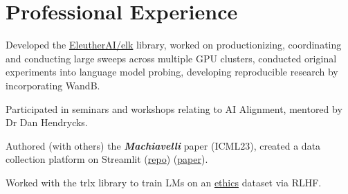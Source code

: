 \documentclass[]{deedy-resume-openfont}
\begin{document}
\begin{minipage}[t]{0.66\textwidth} 


\section{Professional Experience}

\vspace{\topsep} %
\begin{tightemize}
\item Developed the \href{https://github.com/EleutherAI/elk}{EleutherAI/elk} library, worked on productionizing, coordinating and conducting large sweeps across multiple GPU clusters, conducted original experiments into language model probing, developing reproducible research by incorporating WandB.
\end{tightemize}
\sectionsep

\vspace{\topsep} %
\begin{tightemize}
\item Participated in seminars and workshops relating to AI Alignment, mentored by Dr Dan Hendrycks.
\item Authored (with others) the \emph{\textbf{Machiavelli}}
paper (ICML23), created a data collection platform on Streamlit (\href{https://github.com/derpyplops/cyoa-streamlit}{repo})
(\href{https://arxiv.org/abs/2304.03279}{paper}).
\item Worked with the trlx library to train LMs on an \href{https://github.com/hendrycks/ethics}{ethics} dataset via RLHF.


\end{tightemize}
\end{minipage}
\end{document}
